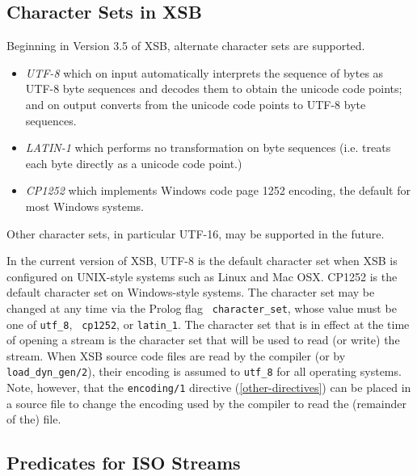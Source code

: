 \subsection{Character Sets in XSB}\label{sec-charsets}
%
Beginning in Version 3.5 of XSB, alternate character sets are supported.  
%
\begin{itemize}
\item {\em UTF-8} which on input automatically interprets the sequence
of bytes as UTF-8 byte sequences and decodes them to obtain the
unicode code points; and on output converts from the unicode code
points to UTF-8 byte sequences.
%
\item {\em LATIN-1} which performs no transformation on byte sequences 
(i.e. treats each byte directly as a unicode code point.)
%
\item {\em CP1252} which implements Windows code page 1252 encoding, the 
default for most Windows systems.
\end{itemize}

Other character sets, in particular UTF-16, may be supported in the
future.

In the current version of XSB, UTF-8 is the default character set when
XSB is configured on UNIX-style systems such as Linux and Mac OSX.
CP1252 is the default character set on Windows-style systems.  The
character set may be changed at any time via the Prolog flag {\tt
  character\_set}, whose value must be one of {\tt utf\_8}, {\tt
  cp1252}, or {\tt latin\_1}.  The character set that is in effect at
the time of opening a stream is the character set that will be used to
read (or write) the stream.  When XSB source code files are read by
the compiler (or by {\tt load\_dyn\_gen/2}), their encoding is assumed
to {\tt utf\_8} for all operating systems.  Note, however, that the
{\tt encoding/1} directive (\ref{other-directives}) can be placed in a
source file to change the encoding used by the compiler to read the
(remainder of the) file.


\subsection{Predicates for ISO Streams}

